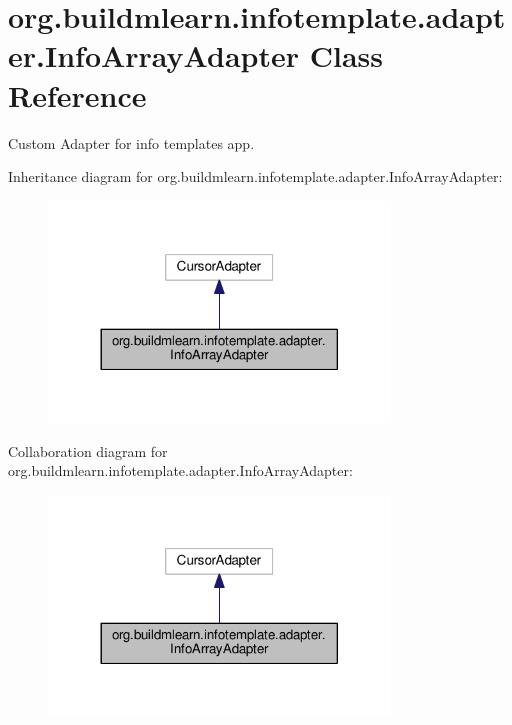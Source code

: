 \hypertarget{classorg_1_1buildmlearn_1_1infotemplate_1_1adapter_1_1InfoArrayAdapter}{}\section{org.\+buildmlearn.\+infotemplate.\+adapter.\+Info\+Array\+Adapter Class Reference}
\label{classorg_1_1buildmlearn_1_1infotemplate_1_1adapter_1_1InfoArrayAdapter}


Custom Adapter for info template\textquotesingle{}s app.  




Inheritance diagram for org.\+buildmlearn.\+infotemplate.\+adapter.\+Info\+Array\+Adapter\+:
\nopagebreak
\begin{figure}[H]
\begin{center}
\leavevmode
\includegraphics[width=257pt]{classorg_1_1buildmlearn_1_1infotemplate_1_1adapter_1_1InfoArrayAdapter__inherit__graph}
\end{center}
\end{figure}


Collaboration diagram for org.\+buildmlearn.\+infotemplate.\+adapter.\+Info\+Array\+Adapter\+:
\nopagebreak
\begin{figure}[H]
\begin{center}
\leavevmode
\includegraphics[width=257pt]{classorg_1_1buildmlearn_1_1infotemplate_1_1adapter_1_1InfoArrayAdapter__coll__graph}
\end{center}
\end{figure}
